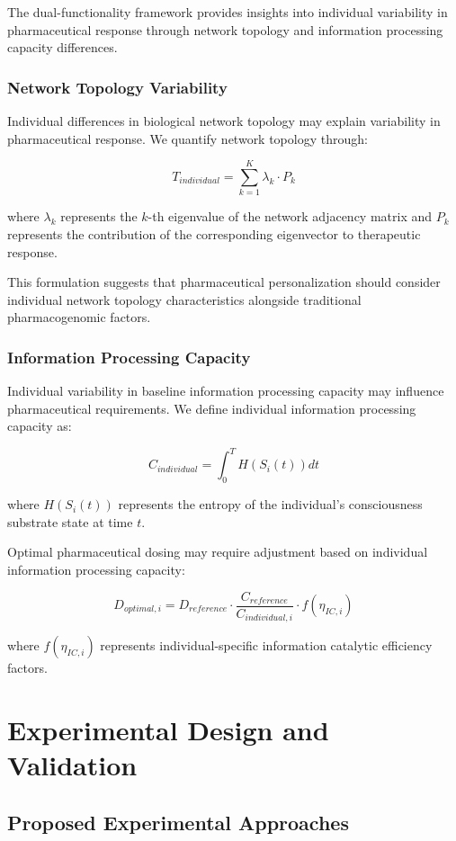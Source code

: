 \documentclass[12pt,a4paper]{article}
\begin{document}
The dual-functionality framework provides insights into individual variability in pharmaceutical response through network topology and information processing capacity differences.

\subsubsection{Network Topology Variability}

Individual differences in biological network topology may explain variability in pharmaceutical response. We quantify network topology through:

$$T_{individual} = \sum_{k=1}^{K} \lambda_k \cdot P_k$$

where $\lambda_k$ represents the $k$-th eigenvalue of the network adjacency matrix and $P_k$ represents the contribution of the corresponding eigenvector to therapeutic response.

This formulation suggests that pharmaceutical personalization should consider individual network topology characteristics alongside traditional pharmacogenomic factors.

\subsubsection{Information Processing Capacity}

Individual variability in baseline information processing capacity may influence pharmaceutical requirements. We define individual information processing capacity as:

$$C_{individual} = \int_0^{T} H(S_i(t)) dt$$

where $H(S_i(t))$ represents the entropy of the individual's consciousness substrate state at time $t$.

Optimal pharmaceutical dosing may require adjustment based on individual information processing capacity:

$$D_{optimal,i} = D_{reference} \cdot \frac{C_{reference}}{C_{individual,i}} \cdot f(\eta_{IC,i})$$

where $f(\eta_{IC,i})$ represents individual-specific information catalytic efficiency factors.

\section{Experimental Design and Validation}

\subsection{Proposed Experimental Approaches}
\end{document}
